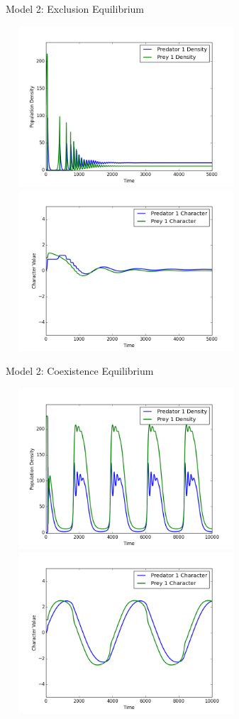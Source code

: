 \documentclass{amsart}
\theoremstyle{definition}
\theoremstyle{remark}
\numberwithin{equation}{section}
\begin{document}
\begin{centering}
\begin{figure}[h]
		\caption{Model 2: Exclusion Equilibrium}
		\label{fig:variable_growth_exclusion}
	\end{figure}
	\begin{figure}[h]
		\includegraphics[width=9cm,height=6cm]{figures/1x1/variable_growth/stable_coexistence/densities.png}
		\includegraphics[width=9cm,height=6cm]{figures/1x1/variable_growth/stable_coexistence/traits.png}
		\caption{Model 2: Coexistence Equilibrium}
		\label{fig:variable_growth_coexistence_equilibrium}
	\end{figure}
	\begin{figure}[h]
		\includegraphics[width=9cm,height=6cm]{figures/1x1/variable_growth/stable_cycles/densities.png}
		\includegraphics[width=9cm,height=6cm]{figures/1x1/variable_growth/stable_cycles/traits.png}

\end{figure}
\end{centering}
\end{document}
